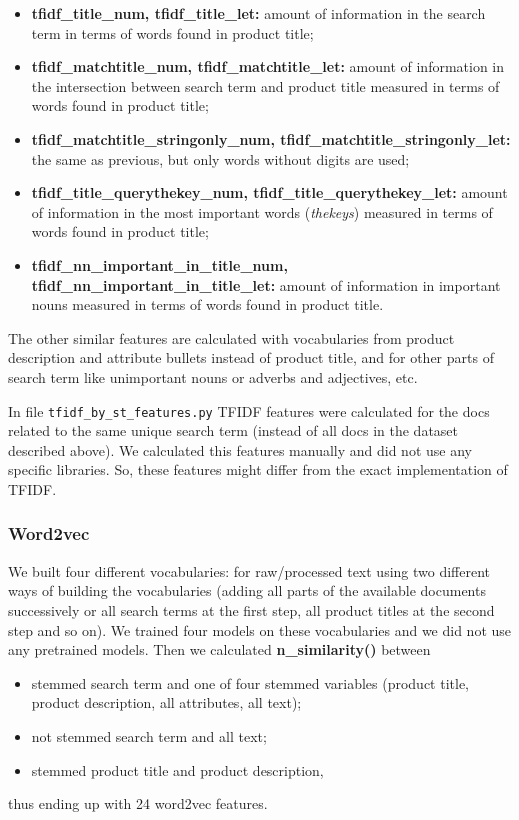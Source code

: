 \documentclass[12pt]{article}
\begin{document}
{{\begin{itemize}
\item \textbf{tfidf\_title\_num, tfidf\_title\_let:} amount of information in the search term in terms of words found in product title;
\item \textbf{tfidf\_matchtitle\_num, tfidf\_matchtitle\_let:} amount of information in the intersection between search term and product title measured in terms of words found in product title;
\item \textbf{tfidf\_matchtitle\_stringonly\_num, tfidf\_matchtitle\_stringonly\_let:} the same as previous, but only words without digits are used;
\item \textbf{tfidf\_title\_querythekey\_num, tfidf\_title\_querythekey\_let:} amount of information in the most important words (\emph{thekeys}) measured in terms of words found in product title;
\item \textbf{tfidf\_nn\_important\_in\_title\_num, tfidf\_nn\_important\_in\_title\_let:} amount of information in important nouns measured in terms of words found in product title.
\end{itemize}

The other similar features are calculated with vocabularies from product description and attribute bullets instead of product title, and for other parts of search term like unimportant nouns or adverbs and adjectives, etc.

In file \texttt{tfidf\_by\_st\_features.py} TFIDF features were calculated for the docs related to the same unique search term (instead of all docs in the dataset described above). We calculated this features manually and did not use any specific libraries. So, these features might differ from the exact implementation of TFIDF.


\subsubsection{Word2vec}
\label{subsubsec:word2vec_IandK}

We built four different vocabularies: for raw/processed text using two different ways of  building the vocabularies (adding all parts of the available documents successively or  all search terms at the first step, all product titles at the second step and so on). We trained four models on these vocabularies and we did not use any pretrained models. Then we calculated \textbf{n\_similarity()} between
\begin{itemize}
\item  stemmed search term and one of four stemmed variables (product title, product
description, all attributes, all text);
\item not stemmed search term and all text;
\item stemmed product title and  product description,
\end{itemize}
thus ending up with 24 word2vec features.

}}
\end{document}
